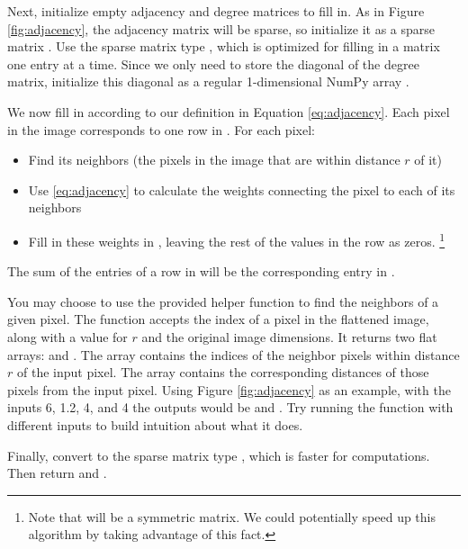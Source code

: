 Next, initialize empty adjacency and degree matrices to fill in.
As in Figure \ref{fig:adjacency}, the adjacency matrix will be sparse, so initialize it as a sparse matrix .
Use the sparse matrix type , which is optimized for filling in a matrix one entry at a time.
Since we only need to store the diagonal of the degree matrix, initialize this diagonal as a regular 1-dimensional NumPy array .

We now fill in  according to our definition in Equation \ref{eq:adjacency}.
Each pixel in the image corresponds to one row in .
For each pixel:
\begin{itemize}
\item Find its neighbors (the pixels in the image that are within distance $r$ of it)
\item Use \ref{eq:adjacency} to calculate the weights connecting the pixel to each of its neighbors
\item Fill in these weights in , leaving the rest of the values in the row as zeros. \footnote{Note that  will be a symmetric matrix. We could potentially speed up this algorithm by taking advantage of this fact.}
\end{itemize}
The sum of the entries of a row in  will be the corresponding entry in .

You may choose to use the provided helper function  to find the neighbors of a given pixel.
The function accepts the index of a pixel in the flattened image, along with a value for $r$ and the original image dimensions.
It returns two flat arrays:  and .
The array  contains the indices of the neighbor pixels within distance $r$ of the input pixel.
The array  contains the corresponding distances of those pixels from the input pixel.
Using Figure \ref{fig:adjacency} as an example, with the inputs 6, 1.2, 4, and 4 the outputs would be  and .
Try running the function with different inputs to build intuition about what it does.

Finally, convert  to the sparse matrix type , which is faster for computations. Then return  and .

